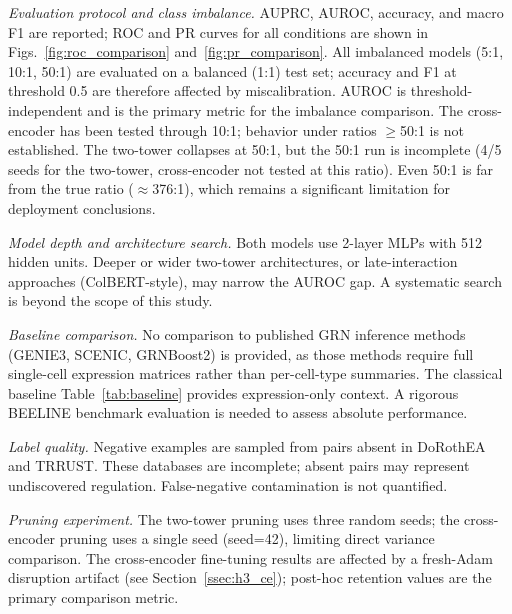 \documentclass[journal]{IEEEtran}
\begin{document}
\emph{Evaluation protocol and class imbalance.}
AUPRC, AUROC, accuracy, and macro F1 are reported; ROC and PR curves for all
conditions are shown in Figs.~\ref{fig:roc_comparison}
and~\ref{fig:pr_comparison}. All imbalanced models (5:1, 10:1, 50:1) are
evaluated on a balanced (1:1) test set; accuracy and F1 at threshold 0.5 are
therefore affected by miscalibration. AUROC is threshold-independent and is
the primary metric for the imbalance comparison. The cross-encoder has been
tested through 10:1; behavior under ratios $\geq$50:1 is not established.
The two-tower collapses at 50:1, but the 50:1 run is incomplete (4/5 seeds
for the two-tower, cross-encoder not tested at this ratio). Even 50:1 is
far from the true ratio ($\approx$376:1), which remains a significant
limitation for deployment conclusions.

\emph{Model depth and architecture search.}
Both models use 2-layer MLPs with 512 hidden units. Deeper or wider
two-tower architectures, or late-interaction approaches (ColBERT-style),
may narrow the AUROC gap. A systematic search is beyond the scope of this
study.

\emph{Baseline comparison.}
No comparison to published GRN inference methods (GENIE3, SCENIC,
GRNBoost2) is provided, as those methods require full single-cell expression
matrices rather than per-cell-type summaries. The classical baseline
Table~\ref{tab:baseline} provides expression-only context.
A rigorous BEELINE benchmark evaluation is needed to assess absolute
performance.

\emph{Label quality.}
Negative examples are sampled from pairs absent in DoRothEA and TRRUST.
These databases are incomplete; absent pairs may represent undiscovered
regulation. False-negative contamination is not quantified.

\emph{Pruning experiment.}
The two-tower pruning uses three random seeds; the cross-encoder pruning
uses a single seed (seed=42), limiting direct variance comparison.
The cross-encoder fine-tuning results are affected by a fresh-Adam
disruption artifact (see Section~\ref{ssec:h3_ce}); post-hoc retention
values are the primary comparison metric.
\end{document}
